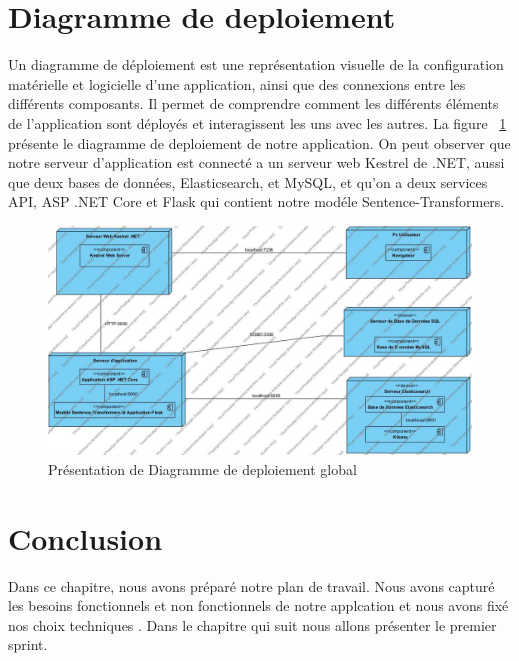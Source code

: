 \newpage
\section{Diagramme de deploiement}
\noindent
Un diagramme de déploiement est une représentation visuelle de la configuration
matérielle et logicielle d'une application, ainsi que des connexions entre les différents composants. Il permet de comprendre comment les différents éléments de l'application sont déployés et interagissent les uns avec les autres. La figure ~\ref{fig:diagdepglobal} présente le diagramme de deploiement de notre application. On peut observer que notre serveur d'application est connecté a un serveur web Kestrel de .NET, aussi que deux bases de données, Elasticsearch, et MySQL, et qu'on a deux services API, ASP .NET Core et Flask qui contient notre modéle Sentence-Transformers.


\begin{figure}[H]
\centering
\includegraphics[width=1\textwidth]{logos/deployment.png}
\caption{Présentation de Diagramme de deploiement global}
\label{fig:diagdepglobal}
\end{figure}


\section{Conclusion}
\noindent
Dans ce chapitre, nous avons préparé notre plan de travail. Nous avons capturé les besoins fonctionnels et non fonctionnels de notre applcation et nous avons fixé nos choix techniques .
Dans le chapitre qui suit nous allons présenter le premier sprint. 
